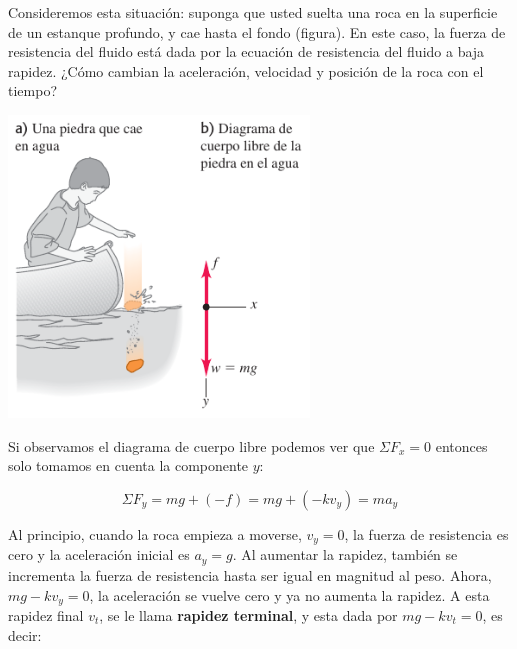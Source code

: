 \documentclass{article}
\newcommand{\bl}[1]{\textbf{#1}}
\begin{document}
    \begin{multicols}{2}
        \begin{minipage}{0.6\textwidth}
            \par Consideremos esta situación: suponga que usted suelta una roca en la superficie de un estanque profundo, y cae hasta el fondo (figura). En este caso, la fuerza de resistencia del fluido está dada por la ecuación de resistencia del fluido a baja rapidez. ¿Cómo cambian la aceleración, velocidad y posición de la roca con el tiempo?
            
        \end{minipage}

        \columnbreak

        \begin{minipage}{0.6\textwidth}
            \centering

            \includegraphics[width=0.6\textwidth]{img/3.3-6.png}
        \end{minipage}
    \end{multicols}

    \par Si observamos el diagrama de cuerpo libre podemos ver que $\Sigma F_x = 0$ entonces solo tomamos en cuenta la componente $y$:

    \[ \Sigma F_y = mg + (-f) = mg + (-kv_y) = ma_y \]

    \par Al principio, cuando la roca empieza a moverse, $v_y = 0$, la fuerza de resistencia es cero y la aceleración inicial es $a_y = g$. Al aumentar la rapidez, también se incrementa la fuerza de resistencia hasta ser igual en magnitud al peso. Ahora, $mg - kv_y = 0$, la aceleración se vuelve cero y ya no aumenta la rapidez. A esta rapidez final $v_t$, se le llama \bl{rapidez terminal}, y esta dada por $mg - kv_t = 0$, es decir:
\end{document}
